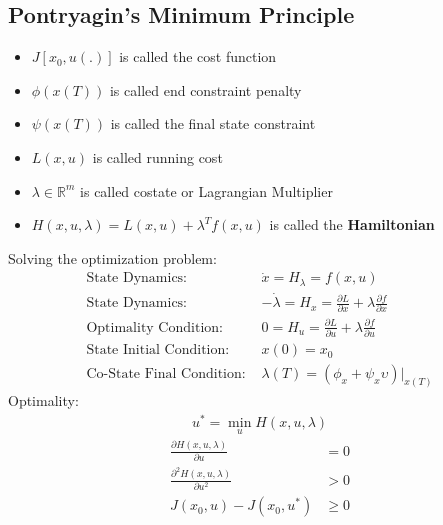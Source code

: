 \subsection{Pontryagin's Minimum Principle}
\begin{itemize}
    \item $J[x_0,u(.)]$ is called the cost function
    \item $\phi(x(T))$ is called end constraint penalty
    \item $\psi(x(T))$ is called the final state constraint
    \item $L(x,u)$ is called running cost
    \item $\lambda \in \mathbb{R}^m$ is called costate or Lagrangian Multiplier
    \item $H(x,u,\lambda) = L(x,u) + \lambda^T f(x,u)$ is called the \textbf{Hamiltonian}
\end{itemize}
Solving the optimization problem:
\begin{align*}
    \text{State Dynamics: }           & \Dot{x} = H_\lambda = f(x,u)                                                                 \\
    \text{State Dynamics: }           & -\Dot{\lambda} = H_x = \frac{\partial L}{\partial x} + \lambda \frac{\partial f}{\partial x} \\
    \text{Optimality Condition: }     & 0 = H_u = \frac{\partial L}{\partial u} + \lambda \frac{\partial f}{\partial u}              \\
    \text{State Initial Condition: }  & x(0) = x_0                                                                                   \\
    \text{Co-State Final Condition: } & \lambda(T) = (\phi_x + \psi_x \upsilon)\rvert_{x(T)}
\end{align*}
Optimality:
\begin{align*}
    \boxed{u^{\ast} = \min_u H(x,u,\lambda)}
\end{align*}
\begin{align*}
    \frac{\partial H(x,u,\lambda)}{\partial u}     & = 0    \\
    \frac{\partial^2 H(x,u,\lambda)}{\partial u^2} & > 0    \\
    J(x_0,u) - J(x_0,u^\ast)                       & \geq 0
\end{align*}